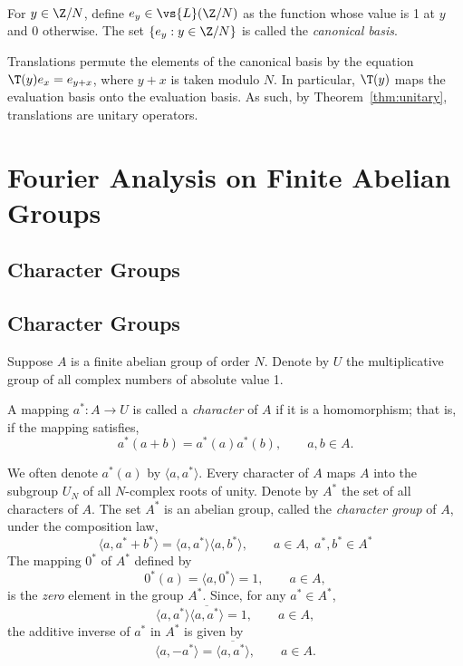 \begin{definition}\\
For $y\in \Z/N$, define $e_y \in \vs{L}(\Z/N)$ as the function whose value is 1 at
$y$ and 0 otherwise.  The set $\{ e_y : y\in \Z/N\}$ is called the
\emph{canonical basis}.
\end{definition}
Translations permute the elements of the canonical basis by the equation
$\T(y)e_x = e_{y+x}$, where $y+x$ is taken modulo $N$.  
In particular, $\T(y)$ maps the evaluation basis onto the
evaluation basis.  As such, by Theorem~\ref{thm:unitary}, translations
are unitary operators.

\section{Fourier Analysis on Finite Abelian Groups}
\label{sec:four-analys-over}
{\subsection{Character Groups}}
{\subsection{Character Groups\protect\footnotemark}
}
Suppose $A$ is a finite abelian group of order $N$.  Denote by $U$ the
multiplicative group of all complex numbers of absolute value 1.
\begin{definition}[Character]
A mapping $a^*: A \to U$ is called a \emph{character} of $A$ if it is
a homomorphism; that is, if the mapping satisfies, 
\[
a^*(a+b) = a^*(a)a^*(b), \qquad a, b \in A.
\]
\end{definition}
We often denote $a^*(a)$ by $\langle a, a^* \rangle$.
Every character of $A$ maps $A$ into the subgroup $U_N$ of all
$N$-complex roots of unity.
Denote by $A^*$ the set of all characters of $A$.  The set $A^*$ is an abelian
group, called the \emph{character group} of $A$, under the composition law,
\[
\langle a, a^* + b^* \rangle = \langle a, a^* \rangle \langle a, b^* \rangle,
\qquad a \in A, \; a^*, b^* \in A^*
\]
The mapping $0^*$ of $A^*$ defined by
\[ 
0^*(a) = \langle a, 0^* \rangle = 1, \qquad a \in A,
\]
is the \emph{zero} element in the group $A^*$.  
Since, for any $a^*\in A^*$,
\[
\langle a, a^* \rangle \overline{\langle a, a^* \rangle}= 1, \qquad a\in A,
\]
the additive inverse of $a^*$ in $A^*$ is given by 
\[
\langle a, -a^* \rangle  = \overline{\langle a, a^* \rangle}, \qquad a\in A.
\]


